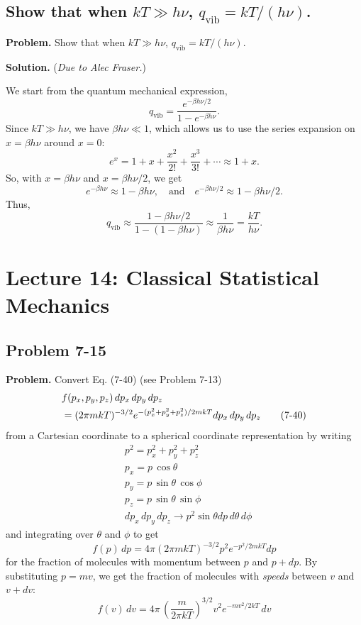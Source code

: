 \documentclass[twocolumn, 10pt]{article}
\numberwithin{equation}{section}
\newenvironment{problem}
{\par\medskip\sffamily \color{problue}
  \textbf{Problem. }\ignorespaces}
{\medskip}
\newenvironment{solution}
{\par\medskip
  \textbf{Solution. }\ignorespaces}
{\medskip}
\begin{document}
\subsection{Show that when $kT \gg h\nu$, $q_\mathrm{vib} = kT/(h\nu)$.}

\begin{problem}
Show that when $kT \gg h\nu$, $q_\mathrm{vib} = kT/(h\nu)$.
\end{problem}

\begin{solution}
  (\emph{Due to Alec Fraser.})

We start from the quantum mechanical expression,
$$
q_\mathrm{vib} = \frac{e^{-\beta h\nu/2}}{1- e^{-\beta h\nu}}.
$$
Since $kT \gg h\nu$, we have $\beta h\nu \ll 1$,
which allows us to use the series expansion on $x = \beta h \nu$
around $x = 0$:
%
$$
e^x = 1 + x + \frac{x^2}{2!} + \frac{x^3}{3!} + \cdots \approx 1 + x.
$$
%
So, with $x = \beta h \nu$ and $x = \beta h \nu/2$, we get
$$
e^{-\beta h \nu} \approx 1 - \beta h \nu,
\quad
\mbox{and}
\quad
e^{-\beta h \nu/2} \approx 1 - \beta h \nu/2.
$$
Thus,
$$q_\mathrm{vib} \approx
\frac{1-\beta h\nu/2}{1- (1-\beta h\nu)}
\approx
\frac{1}{\beta h\nu} = \frac{kT}{h\nu}.
$$
\end{solution}


\section{Lecture 14: Classical Statistical Mechanics}

\subsection{Problem 7-15}

\begin{problem}
  Convert Eq. (7-40) (see Problem 7-13)
  \begin{align}
    &f(p_x, p_y, p_z) \, d p_x \, d p_y \, d p_z
    \notag \\
    &=
    (2 \pi m k T)^{-3/2}
    e^{-(p_x^2 + p_y^2 + p_z^2) / 2 m k T}
    d p_x \, d p_y \, d p_z
    \tag{7-40}
  \end{align}
  from a Cartesian coordinate to
  a spherical coordinate representation
  by writing
  \begin{align*}
    &p^2 = p_x^2 + p_y^2 + p_z^2 \\
    &p_x = p \, \cos\theta \\
    &p_y = p \, \sin\theta \, \cos\phi \\
    &p_z = p \, \sin\theta \, \sin\phi \\
    &d p_x \, d p_y \, d p_z
    \to p^2 \sin\theta d p \, d\theta \, d\phi
  \end{align*}
  and integrating over $\theta$ and $\phi$ to get
  $$
  f(p) \, dp
  =
  4 \pi (2\pi m k T)^{-3/2} p^2 e^{-p^2/2mkT} dp
  $$
  for the fraction of molecules
  with momentum between $p$ and $p+dp$.
  By substituting $p = mv$,
  we get the fraction of molecules with \emph{speeds}
  between $v$ and $v+dv$:
  $$
  f(v) \, dv
  =
  4 \pi \, \left( \frac{ m } { 2 \pi k T } \right)^{3/2}
  v^2 e^{-mv^2/2kT} \, dv
  $$
\end{problem}
\end{document}
